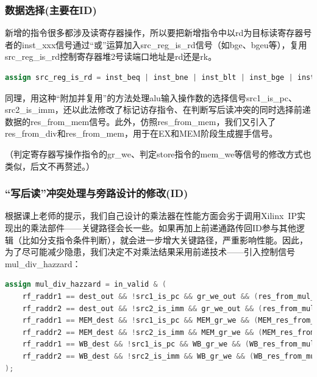 \documentclass[11pt]{article}
\begin{document}
\subsubsection{数据选择(主要在ID)}

新增的指令很多都涉及读寄存器操作，所以要把新增指令中以rd为目标读寄存器号者的inst_xxx信号通过“或”运算加入src_reg_is_rd信号（如bge、bgeu等），复用src_reg_is_rd控制寄存器堆2号读端口地址是rd还是rk。
\begin{lstlisting}[language=Verilog, caption={src\_reg\_is\_rd信号}]
assign src_reg_is_rd = inst_beq | inst_bne | inst_blt | inst_bge | inst_bltu | inst_bgeu | inst_st_b | inst_st_h | inst_st_w;
\end{lstlisting}

同理，用这种“附加并复用”的方法处理alu输入操作数的选择信号src1_is_pc、src2_is_imm，还以此法修改了标记访存指令、在判断写后读冲突的同时选择前递数据的res_from_mem信号。此外，仿照res_from_mem，我们又引入了res_from_div和res_from_mem，用于在EX和MEM阶段生成握手信号。

（判定寄存器写操作指令的gr_we、判定store指令的mem_we等信号的修改方式也类似，后文不再赘述。）

\subsubsection{“写后读”冲突处理与旁路设计的修改(ID)}

根据课上老师的提示，我们自己设计的乘法器在性能方面会劣于调用Xilinx\ IP实现出的乘法部件——关键路径会长一些。如果再加上前递通路传回ID参与其他逻辑（比如分支指令条件判断），就会进一步增大关键路径，严重影响性能。因此，为了尽可能减少隐患，我们决定不对乘法结果采用前递技术——引入控制信号mul_div_hazzard：

\begin{lstlisting}[language=Verilog, caption={caption text}]
assign mul_div_hazzard = in_valid & (
    rf_raddr1 == dest_out && !src1_is_pc && gr_we_out && (res_from_mul_out || res_from_div_out) && out_valid ||
    rf_raddr2 == dest_out && !src2_is_imm && gr_we_out && (res_from_mul_out || res_from_div_out) && out_valid ||
    rf_raddr1 == MEM_dest && !src1_is_pc && MEM_gr_we && (MEM_res_from_mul || MEM_res_from_div) && MEM_valid ||
    rf_raddr2 == MEM_dest && !src2_is_imm && MEM_gr_we && (MEM_res_from_mul || MEM_res_from_div) && MEM_valid ||
    rf_raddr1 == WB_dest && !src1_is_pc && WB_gr_we && (WB_res_from_mul || WB_res_from_div) && WB_valid ||
    rf_raddr2 == WB_dest && !src2_is_imm && WB_gr_we && (WB_res_from_mul || WB_res_from_div) && WB_valid
);
\end{lstlisting}
\end{document}
